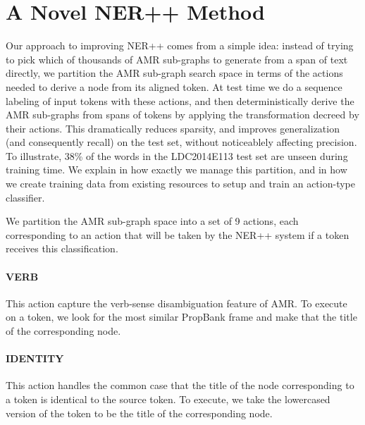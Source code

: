\documentclass[11pt]{article}
\begin{document}


\section{A Novel NER++ Method}\label{sec:nerplusplus}
Our approach to improving NER++ comes from a simple idea: instead of trying to pick 
  which of thousands of AMR sub-graphs to generate from a span of text directly, 
  we partition the AMR sub-graph search space in terms of the actions needed to 
  derive a node from its aligned token. 
At test time we do a sequence labeling of input tokens with these actions, and 
  then deterministically derive the AMR sub-graphs from spans of tokens by applying 
  the transformation decreed by their actions. 
This dramatically reduces sparsity, and improves generalization (and consequently
  recall) on the test set, without noticeablely affecting precision.
To illustrate, 38\% of the words in the LDC2014E113 test set are 
  unseen during training time.
We explain in  how exactly we manage this partition, and in  how we create training data from existing resources to setup and train an action-type classifier.


We partition the AMR sub-graph space into a set of 9 actions, each corresponding to an action that will be taken by the NER++ system if a token receives this classification.

\paragraph{VERB} This action capture the verb-sense disambiguation feature of AMR. To execute on a token, we look for the most similar PropBank frame and make that the title of the corresponding node.

\paragraph{IDENTITY} This action handles the common case that the title of the node corresponding to a token is identical to the source token. To execute, we take the lowercased version of the token to be the title of the corresponding node.
\end{document}

